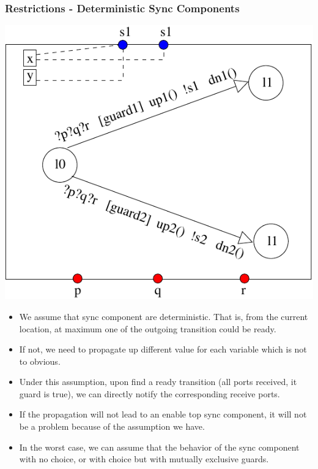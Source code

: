 \documentclass[compress,xcolor=dvipsnames,10pt]{beamer}
\begin{document}
\begin{frame}
\frametitle{Restrictions - Deterministic Sync Components}

\begin{center}
\includegraphics[scale=0.35]{deterministicSync.pdf}
\end{center}

\begin{itemize}
\item We assume that sync component are deterministic. That is, from the current location, at maximum one of the outgoing transition could be ready.
\item If not, we need to propagate up different value for each variable which is not to obvious. 
\item Under this assumption, upon find a ready transition (all ports received, it guard is true), we can directly notify the corresponding receive ports. 
\item If the propagation will not lead to an enable top sync component, it will not be a problem because of the assumption we have. 
\item In the worst case, we can assume that the behavior of the sync component with no choice, or with choice but with mutually exclusive guards.  
\end{itemize}
 
\end{frame}
\end{document}
